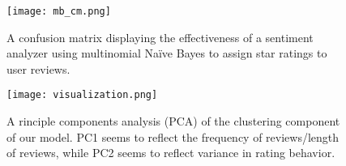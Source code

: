 \begin{figure}[h]
	\centering
	\texttt{[image: mb\_cm.png]}
	\caption{A confusion matrix displaying the effectiveness of a sentiment analyzer using multinomial Na\"ive Bayes to assign star ratings to user reviews.}
	\label{fig:cm}
\end{figure}

\begin{figure}[h]
	\centering
	\texttt{[image: visualization.png]}
	\caption{A rinciple components analysis (PCA) of the clustering component of our model. PC1 seems to reflect the frequency of reviews/length of reviews, while PC2 seems to reflect variance in rating behavior.}
	\label{fig:pca}
\end{figure}